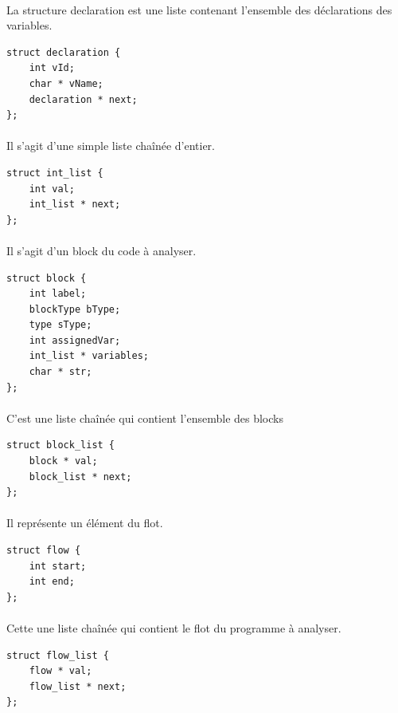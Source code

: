 \documentclass[12pt,a4paper,oneside]{article}
\begin{document}
\paragraph{}
La structure declaration est une liste contenant l'ensemble des déclarations des variables.
\begin{lstlisting}
struct declaration {
	int vId;
	char * vName;
	declaration * next;
};
\end{lstlisting}

\paragraph{}
Il s'agit d'une simple liste chaînée d'entier.
\begin{lstlisting}
struct int_list {
	int val;
	int_list * next;
};
\end{lstlisting}

\paragraph{}
Il s'agit d'un block du code à analyser.
\begin{lstlisting}
struct block {
	int label;
	blockType bType;
	type sType;
	int assignedVar;
	int_list * variables;
	char * str;
};
\end{lstlisting}

\paragraph{}
C'est une liste chaînée qui contient l'ensemble des blocks
\begin{lstlisting}
struct block_list {
	block * val;
	block_list * next;
};
\end{lstlisting}

\paragraph{}
Il représente un élément du flot.
\begin{lstlisting}
struct flow {
	int start;
	int end;
};
\end{lstlisting}

\paragraph{}
Cette une liste chaînée qui contient le flot du programme à analyser.
\begin{lstlisting}
struct flow_list {
	flow * val;
	flow_list * next;
};
\end{lstlisting}
\end{document}
